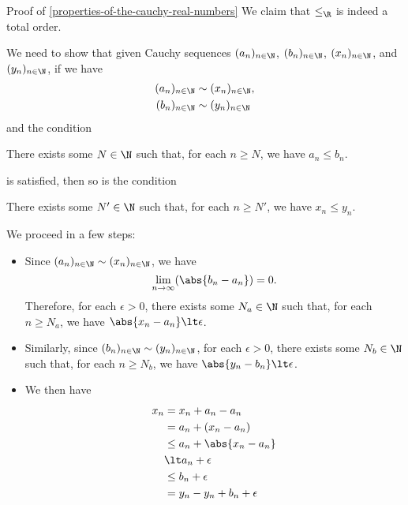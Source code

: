 \begin{Proof}{Proof of \cref{properties-of-the-cauchy-real-numbers}}%
    We claim that $\leq_{\R}$ is indeed a total order.

    We need to show that given Cauchy sequences $(a_{n})_{n\in\N}$, $(b_{n})_{n\in\N}$, $(x_{n})_{n\in\N}$, and $(y_{n})_{n\in\N}$, if we have
    \begin{align*}
        (a_{n})_{n\in\N} &\sim (x_{n})_{n\in\N},\\
        (b_{n})_{n\in\N} &\sim (y_{n})_{n\in\N}
    \end{align*}
    and the condition
    \begin{itemize}
        \itemstar There exists some $N\in\N$ such that, for each $n\geq N$, we have $a_{n}\leq b_{n}$.
    \end{itemize}
    is satisfied, then so is the condition
    \begin{itemize}
        \itemstar There exists some $N'\in\N$ such that, for each $n\geq N'$, we have $x_{n}\leq y_{n}$.
    \end{itemize}
    We proceed in a few steps:
    \begin{itemize}
        \item Since $(a_{n})_{n\in\N}\sim(x_{n})_{n\in\N}$, we have
            \[
                \lim_{n\to\infty}(\abs{b_{n}-a_{n}})%
                =%
                0.%
            \]%
            Therefore, for each $\epsilon\gt0$, there exists some $N_{a}\in\N$ such that, for each $n\geq N_{a}$, we have $\abs{x_{n}-a_{n}}\lt\epsilon$.
        \item Similarly, since $(b_{n})_{n\in\N}\sim(y_{n})_{n\in\N}$, for each $\epsilon\gt0$, there exists some $N_{b}\in\N$ such that, for each $n\geq N_{b}$, we have $\abs{y_{n}-b_{n}}\lt\epsilon$.
        \item We then have
            \begin{align*}
                x_{n} &=     x_{n}+a_{n}-a_{n}\\
                      &=     a_{n}+(x_{n}-a_{n})\\
                      &\leq  a_{n}+\abs{x_{n}-a_{n}}\\
                      &\lt a_{n}+\epsilon\\
                      &\leq  b_{n}+\epsilon\\
                      &=     y_{n}-y_{n}+b_{n}+\epsilon\\

\end{align*}
\end{itemize}
\end{Proof}
